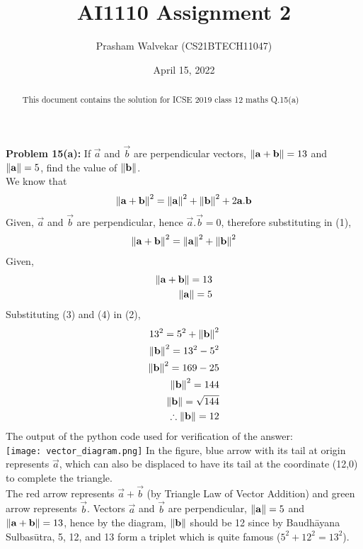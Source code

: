\documentclass[journal,12pt,twocolumn]{IEEEtran}
\begin{document}
     \def\centbox#1{\makebox[0in]{#1}}
     \def\topbox#1{\raisebox{-\baselineskip}[0in][0in]{#1}}
     \def\midbox#1{\raisebox{-0.5\baselineskip}[0in][0in]{#1}}
\vspace{3cm}
\setlength{\columnsep}{0.70cm}
\title{\Huge{\textbf{AI1110 Assignment 2}}}
\author{Prasham Walvekar (CS21BTECH11047)}
\date{April 15, 2022}
\maketitle
\newpage
\bigskip
\begin{abstract}
This document contains the solution for ICSE 2019 class 12 maths Q.15(a)  
\end{abstract}
\textbf{\large{Problem 15(a):}} \large{If \(\vec{a}\) and \(\vec{b}\) are perpendicular vectors,  $\left\lVert\mathbf{a}+\mathbf{b}\right\rVert  = 13 $ and $\left\lVert\mathbf{a}\right\rVert = 5$, find the value of $\left\lVert\mathbf{b}\right\rVert $.}\\
\solution
We know that
\begin{align}
\left\lVert\mathbf{a}+\mathbf{b}\right\rVert^2 = \left\lVert\mathbf{a}\right\rVert^2 + \left\lVert\mathbf{b}\right\rVert^2 + 2 \mathbf{a}.\mathbf{b}
\end{align}
Given, $\vec{a}$ and $\vec{b}$ are perpendicular, hence $\vec{a}.\vec{b}=0$, therefore substituting in (1),
\begin{align}
\left\lVert\mathbf{a}+\mathbf{b}\right\rVert^2 = \left\lVert\mathbf{a}\right\rVert^2 + \left\lVert\mathbf{b}\right\rVert^2
\end{align}
Given,
\begin{align}
\left\lVert\mathbf{a}+\mathbf{b}\right\rVert = 13\\
\left\lVert\mathbf{a}\right\rVert = 5
\end{align}
Substituting (3) and (4) in (2),
\begin{align}
13^2 = 5^2 + \left\lVert\mathbf{b}\right\rVert^2\\
\left\lVert\mathbf{b}\right\rVert^2 = 13^2 - 5^2\\
\left\lVert\mathbf{b}\right\rVert^2 = 169 - 25\\ 
\left\lVert\mathbf{b}\right\rVert^2 = 144\\
\left\lVert\mathbf{b}\right\rVert = \sqrt{144}\\
\therefore \left\lVert\mathbf{b}\right\rVert = 12
\end{align}
The output of the python code used for verification of the answer:\\
\texttt{[image: vector\_diagram.png]}
In the figure, blue arrow with its tail at origin represents $\vec{a}$, which can also be displaced to have its tail at the coordinate (12,0) to complete the triangle.\\
The red arrow represents $\vec{a}+\vec{b}$ (by Triangle Law of Vector Addition) and green arrow represents $\vec{b}$. Vectors $\vec{a}$ and $\vec{b}$ are perpendicular, $\left\lVert\mathbf{a}\right\rVert = 5$ and $\left\lVert\mathbf{a}+\mathbf{b}\right\rVert = 13$, hence by the diagram, $\left\lVert\mathbf{b}\right\rVert$ should be 12 since by Baudhāyana Sulbasūtra, 5, 12, and 13 form a triplet which is quite famous ($5^2+12^2=13^2$).
\end{document}
